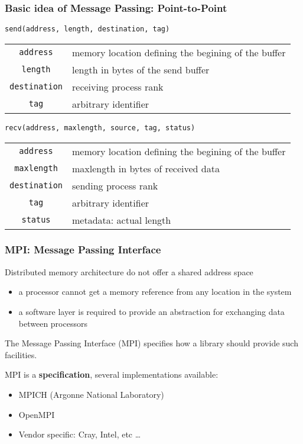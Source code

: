 \begin{frame}
\frametitle{Basic idea of Message Passing: Point-to-Point}

\begin{center}
\texttt{send(address, length, destination, tag)}
\end{center}

\begin{tabular}{|c|l|}
\hline
\texttt{address}    & memory location defining the begining of the buffer\\
\texttt{length}     & length in bytes of the send buffer\\
\texttt{destination}& receiving process rank\\
\texttt{tag}        & arbitrary identifier \\
\hline
\end{tabular}

\begin{center}
\texttt{recv(address, maxlength, source, tag, status)}
\end{center}

\begin{tabular}{|c|l|}
\hline
\texttt{address}    & memory location defining the begining of the buffer\\
\texttt{maxlength}  & maxlength in bytes of received data\\
\texttt{destination}& sending process rank\\
\texttt{tag}        & arbitrary identifier \\
\texttt{status}     & metadata: actual length \\
\hline
\end{tabular}

\end{frame}

\begin{frame}
  \frametitle{MPI: Message Passing Interface}
Distributed memory architecture do not offer a shared address space
\begin{itemize}
\item a processor cannot get a memory reference from any location in the system
\item a software layer is required to provide an abstraction for exchanging data between processors
\end{itemize}

\medskip
The Message Passing Interface (MPI) specifies how a library should provide such facilities.

\medskip
MPI is a \textbf{specification}, several implementations available:
\begin{itemize}
\item MPICH (Argonne National Laboratory)
\item OpenMPI
\item Vendor specific: Cray, Intel, etc \dots
\end{itemize}
\end{frame}

